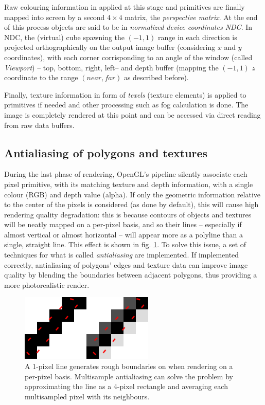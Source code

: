 Raw colouring information in applied at this stage and primitives are finally
mapped into screen by a second $4\times 4$ matrix, the \emph{perspective
matrix}. At the end of this process objects are said to be in \emph{normalized
device coordinates \emph{NDC}}. In NDC, the (virtual) cube spawning the
$\left(-1,1\right)$ range in each direction is projected orthographically on the
output image buffer (considering $x$ and $y$ coordinates), with each corner
corrisponding to an angle of the window (called \emph{Viewport}) -- top, bottom,
right, left-- and depth buffer
(mapping the $(-1,1)$ $z$ coordinate to the range $\left( near , far \right)$ as described
before).

Finally, texture information in form of \emph{texels} (texture elements) is applied to primitives if needed and other
processing such as fog calculation is done. The image is completely rendered at
this point and can be accessed via direct reading from raw data buffers.

\subsection{Antialiasing of polygons and textures} \label{sec:antialiasing}
\label{sec:FBO}
During the last phase of rendering, OpenGL's pipeline silently associate each
pixel primitive, with its matching texture and depth information, with a single
colour (RGB) and depth value (alpha). If only the geometric information relative
to the center of the pixels is considered (as done by default), this will cause
high rendering quality degradation: this is because contours of objects and
textures will be neatly mapped on a per-pixel basis, and so their lines --
especially if almost vertical or almost horizontal -- will appear more as a
polyline than a single, straight line. This effect is shown in fig.
\ref{fig:polyline}. To solve this issue, a set of techniques for what is called
\emph{antialiasing} are implemented. If implemented correctly, antialiasing of
polygons' edges and texture data can improve image quality by blending the
boundaries between adjacent polygons, thus providing a more photorealistic
render.

\begin{figure}[htbp]
  \centering
  \includegraphics[width=2.5in]{./Graphics/antialiasing}
  \caption{A 1-pixel line generates rough boundaries on when rendering on a
  per-pixel basis. Multisample antialiasing can solve the problem by
approximating the line as a 4-pixel rectangle and averaging each multisampled
pixel with its neighbours. \label{fig:polyline}}
\end{figure}

